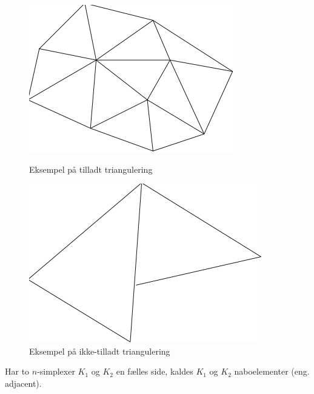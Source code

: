 \begin{figure}[htb]
\noindent
\begin{minipage}[b]{.45\linewidth}
  \centering\includegraphics[width=\linewidth]{lovnet}
  \caption{Eksempel på tilladt triangulering\label{lov}} 
\end{minipage}\hfill
\begin{minipage}[b]{.45\linewidth}
  \centering\includegraphics[width=\linewidth]{ulovnet}
  \caption{Eksempel på ikke-tilladt triangulering\label{ulov}} 
\end{minipage}
\end{figure}
\begin{remark}
Har to $n$-simplexer $K_1$ og $K_2$ en fælles side, kaldes $K_1$ og
$K_2$ naboelementer (eng. adjacent).
\end{remark}

